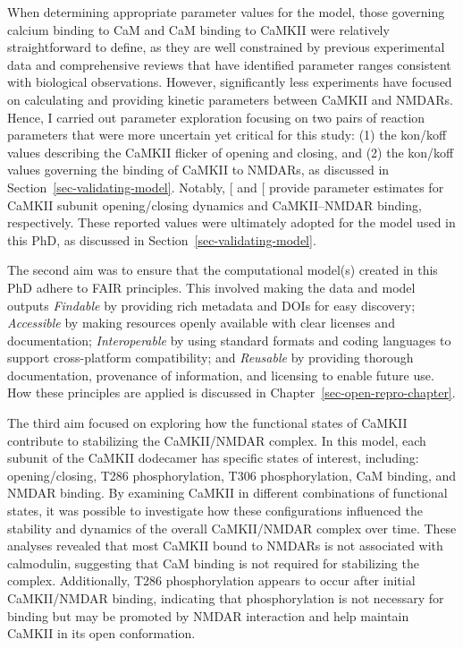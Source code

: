 \documentclass[
  11pt,
  letterpaper,
]{scrreprt}
\begin{document}
When determining appropriate parameter values for the model, those
governing calcium binding to CaM and CaM binding to CaMKII were
relatively straightforward to define, as they are well constrained by
previous experimental data and comprehensive reviews that have
identified parameter ranges consistent with biological observations.
However, significantly less experiments have focused on calculating and
providing kinetic parameters between CaMKII and NMDARs. Hence, I carried
out parameter exploration focusing on two pairs of reaction parameters
that were more uncertain yet critical for this study: (1) the kon/koff
values describing the CaMKII flicker of opening and closing, and (2) the
kon/koff values governing the binding of CaMKII to NMDARs, as discussed
in Section~\ref{sec-validating-model}. Notably,
{[}\citeproc{ref-pharris2019Multistate}{185}{]} and
{[}\citeproc{ref-leonard2002Regulation}{125}{]} provide parameter
estimates for CaMKII subunit opening/closing dynamics and CaMKII--NMDAR
binding, respectively. These reported values were ultimately adopted for
the model used in this PhD, as discussed in
Section~\ref{sec-validating-model}.

The second aim was to ensure that the computational model(s) created in
this PhD adhere to FAIR principles. This involved making the data and
model outputs \emph{Findable} by providing rich metadata and DOIs for
easy discovery; \emph{Accessible} by making resources openly available
with clear licenses and documentation; \emph{Interoperable} by using
standard formats and coding languages to support cross-platform
compatibility; and \emph{Reusable} by providing thorough documentation,
provenance of information, and licensing to enable future use. How these
principles are applied is discussed in
Chapter~\ref{sec-open-repro-chapter}.

The third aim focused on exploring how the functional states of CaMKII
contribute to stabilizing the CaMKII/NMDAR complex. In this model, each
subunit of the CaMKII dodecamer has specific states of interest,
including: opening/closing, T286 phosphorylation, T306 phosphorylation,
CaM binding, and NMDAR binding. By examining CaMKII in different
combinations of functional states, it was possible to investigate how
these configurations influenced the stability and dynamics of the
overall CaMKII/NMDAR complex over time. These analyses revealed that
most CaMKII bound to NMDARs is not associated with calmodulin,
suggesting that CaM binding is not required for stabilizing the complex.
Additionally, T286 phosphorylation appears to occur after initial
CaMKII/NMDAR binding, indicating that phosphorylation is not necessary
for binding but may be promoted by NMDAR interaction and help maintain
CaMKII in its open conformation.
\end{document}
